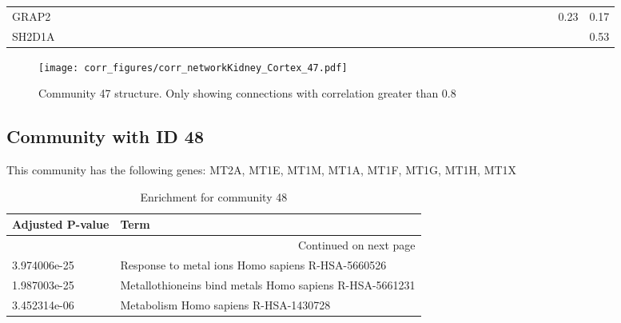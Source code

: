 \begin{longtable}{lrrrrrrrrrrrrrrrrrrrrrrrrrrrrrrrrrrrrrrrrrrrrrr}
GRAP2    &           &           &              &              &            &            &                &             &            &            &             &            &              &            &           &             &              &             &             &            &           &                &              &            &            &             &             &               &               &               &           &              &             &             &             &             &              &               &             &            &              &              &               &             &         0.23 &        0.17 \\
SH2D1A   &           &           &              &              &            &            &                &             &            &            &             &            &              &            &           &             &              &             &             &            &           &                &              &            &            &             &             &               &               &               &           &              &             &             &             &             &              &               &             &            &              &              &               &             &              &        0.53 \\
\end{longtable}


\begin{figure}[h!]
\centering
\texttt{[image: corr\_figures/corr\_networkKidney\_Cortex\_47.pdf]}
\caption{Community 47 structure. Only showing connections with correlation greater than 0.8}
\end{figure}




\subsection*{Community with ID 48}
This community has the following genes: MT2A, MT1E, MT1M, MT1A, MT1F, MT1G, MT1H, MT1X
\\
\begin{longtable}{p{2.4cm}p{14.5cm}}
\caption{Enrichment for community 48}\\
\toprule
Adjusted \newline P-value &                                                     Term \\
\midrule
\endhead
\midrule
\multicolumn{2}{r}{{Continued on next page}} \\
\midrule
\endfoot

\bottomrule
\endlastfoot
             3.974006e-25 &        Response to metal ions Homo sapiens R-HSA-5660526 \\
             1.987003e-25 &  Metallothioneins bind metals Homo sapiens R-HSA-5661231 \\
             3.452314e-06 &                    Metabolism Homo sapiens R-HSA-1430728 \\
\end{longtable}


